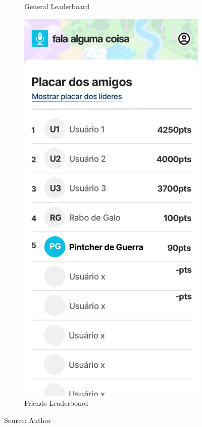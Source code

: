 \begin{figure}[ht]
\begin{subfigure}{.5\textwidth}
      \caption{General Leaderboard}
      \label{fig:falealgumacoisa-leaderboard-page-design-general}
    \end{subfigure}%
    \begin{subfigure}{.5\textwidth}
      \centering
      \includegraphics[width=.9\linewidth]{images/app/leaderboard/FriendsRanking.png}
      \caption{Friends Leaderboard}
      \label{fig:falealgumacoisa-leaderboard-page-design-friend}
    \end{subfigure}
    \caption*{Source: Author}
    \label{fig:falealgumacoisa-leaderboard-page-design}
\end{figure}

